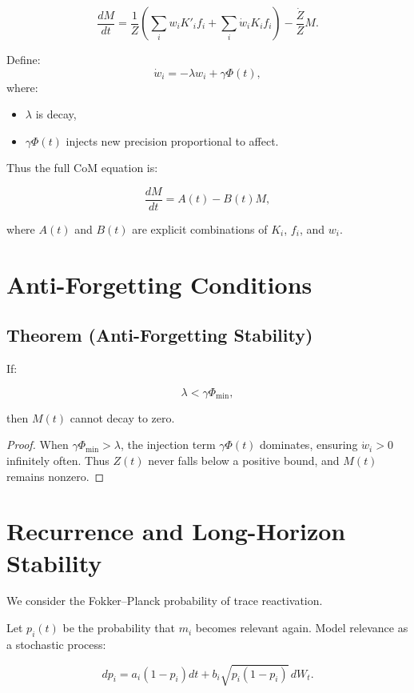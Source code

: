 \documentclass[12pt,oneside]{book}
\theoremstyle{plain}
\theoremstyle{definition}
\begin{document}
\[
\frac{d M}{dt}
=
\frac{1}{Z}
\left(
\sum_i w_i K'_i f_i
+
\sum_i \dot{w}_i K_i f_i
\right)
-
\frac{\dot{Z}}{Z}M.
\]

Define:
\[
\dot{w}_i = -\lambda w_i + \gamma \Phi(t),
\]
where:

\begin{itemize}
    \item $\lambda$ is decay,
    \item $\gamma \Phi(t)$ injects new precision proportional to affect.
\end{itemize}

Thus the full CoM equation is:

\begin{equation}
\label{eq:CoM_full}
\frac{d M}{dt}
=
A(t) - B(t) M,
\end{equation}

where $A(t)$ and $B(t)$ are explicit combinations of $K_i$, $f_i$, and $w_i$.

\section{Anti-Forgetting Conditions}

\subsection{Theorem (Anti-Forgetting Stability)}

If:

\[
\lambda < \gamma \Phi_{\mathrm{min}},
\]

then $M(t)$ cannot decay to zero.

\begin{proof}
When $\gamma \Phi_{\mathrm{min}} > \lambda$, the injection term
$\gamma\Phi(t)$ dominates, ensuring $\dot{w}_i > 0$ infinitely often.
Thus $Z(t)$ never falls below a positive bound, and $M(t)$ remains nonzero.
\end{proof}

\section{Recurrence and Long-Horizon Stability}

We consider the Fokker--Planck probability of trace reactivation.

Let $p_i(t)$ be the probability that $m_i$ becomes relevant again.
Model relevance as a stochastic process:

\[
dp_i = a_i(1-p_i)dt + b_i \sqrt{p_i(1-p_i)}\, dW_t.
\]
\end{document}
